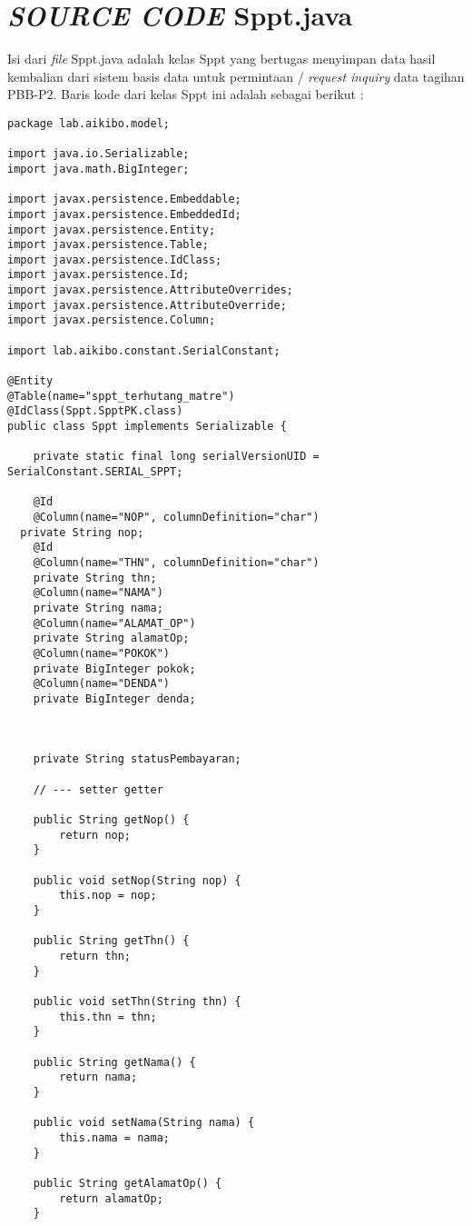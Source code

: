 \documentclass[pdftex,12pt, oneside]{article}
\begin{document}
\section{\textit{SOURCE CODE} Sppt.java}

Isi dari \textit{file} Sppt.java adalah kelas Sppt yang bertugas menyimpan data hasil kembalian dari sistem basis data untuk permintaan / \textit{request inquiry} data tagihan PBB-P2. Baris kode dari kelas Sppt ini adalah sebagai berikut :

\begin{lstlisting}
package lab.aikibo.model;

import java.io.Serializable;
import java.math.BigInteger;

import javax.persistence.Embeddable;
import javax.persistence.EmbeddedId;
import javax.persistence.Entity;
import javax.persistence.Table;
import javax.persistence.IdClass;
import javax.persistence.Id;
import javax.persistence.AttributeOverrides;
import javax.persistence.AttributeOverride;
import javax.persistence.Column;

import lab.aikibo.constant.SerialConstant;

@Entity
@Table(name="sppt_terhutang_matre")
@IdClass(Sppt.SpptPK.class)
public class Sppt implements Serializable {

	private static final long serialVersionUID = SerialConstant.SERIAL_SPPT;

	@Id
	@Column(name="NOP", columnDefinition="char")
  private String nop;
	@Id
	@Column(name="THN", columnDefinition="char")
	private String thn;
	@Column(name="NAMA")
	private String nama;
	@Column(name="ALAMAT_OP")
	private String alamatOp;
	@Column(name="POKOK")
	private BigInteger pokok;
	@Column(name="DENDA")
	private BigInteger denda;



	private String statusPembayaran;

	// --- setter getter

	public String getNop() {
		return nop;
	}

	public void setNop(String nop) {
		this.nop = nop;
	}

	public String getThn() {
		return thn;
	}

	public void setThn(String thn) {
		this.thn = thn;
	}

	public String getNama() {
		return nama;
	}

	public void setNama(String nama) {
		this.nama = nama;
	}

	public String getAlamatOp() {
		return alamatOp;
	}


\end{lstlisting}
\end{document}
